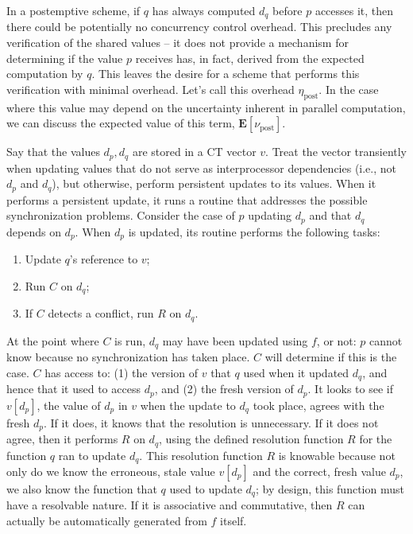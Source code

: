 \documentclass[pageno]{jpaper}
\newcommand{\Ev}{\mathbf{E}}
\begin{document}
In a postemptive scheme, if $q$ has always computed $d_q$ before $p$ accesses
it, then there could be potentially no concurrency control overhead. This
precludes any verification of the shared values -- it does not provide a
mechanism for determining if the value $p$ receives has, in fact, derived from
the expected computation by $q$. This leaves the desire for a scheme that
performs this verification with minimal overhead. Let's call this overhead
$\eta_\text{post}$. In the case where this value may depend on the uncertainty
inherent in parallel computation, we can discuss the expected value of this
term, $\Ev[\nu_\text{post}]$.

Say that the values $d_p, d_q$ are stored in a CT vector $v$. Treat the vector
transiently when updating values that do not serve as interprocessor
dependencies (i.e., not $d_p$ and $d_q$), but otherwise, perform persistent
updates to its values. When it performs a persistent update, it runs a routine
that addresses the possible synchronization problems.  Consider the case of $p$
updating $d_p$ and that $d_q$ depends on $d_p$. When $d_p$ is updated, its
routine performs the following tasks:
\begin{enumerate}
    \item Update $q$'s reference to $v$;
    \item Run $C$ on $d_q$;
    \item If $C$ detects a conflict, run $R$ on $d_q$.
\end{enumerate}

At the point where $C$ is run, $d_q$ may have been updated using $f$, or not:
$p$ cannot know because no synchronization has taken place. $C$ will determine
if this is the case. $C$ has access to: (1) the version of $v$ that $q$ used
when it updated $d_q$, and hence that it used to access $d_p$, and (2) the fresh
version of $d_p$. It looks to see if $v[d_p]$, the value of $d_p$ in $v$ when
the update to $d_q$ took place, agrees with the fresh $d_p$. If it does, it
knows that the resolution is unnecessary. If it does not agree, then it performs
$R$ on $d_q$, using the defined resolution function $R$ for the function $q$ ran
to update $d_q$. This resolution function $R$ is knowable because not only do we
know the erroneous, stale value $v[d_p]$ and the correct, fresh value $d_p$, we
also know the function that $q$ used to update $d_q$; by design, this function
must have a resolvable nature. If it is associative and commutative, then $R$
can actually be automatically generated from $f$ itself.
\end{document}
